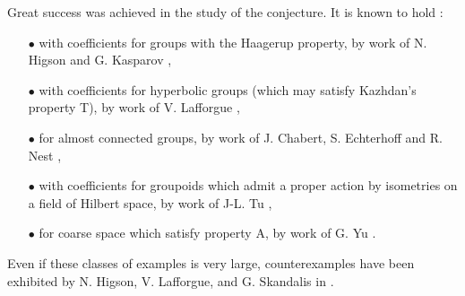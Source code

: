 Great success was achieved in the study of the conjecture. It is known to hold :\\
\begin{itemize}
\item[$\bullet$] with coefficients for groups with the Haagerup property, by work of N. Higson and G. Kasparov \cite{higsonkasparov},
\item[$\bullet$] with coefficients for hyperbolic groups (which may satisfy Kazhdan's property T), by work of V. Lafforgue \cite{Lafforgue}, 
\item[$\bullet$] for almost connected groups, by work of J. Chabert, S. Echterhoff and R. Nest \cite{chabertEN},
\item[$\bullet$] with coefficients for groupoids which admit a proper action by isometries on a field of Hilbert space, by work of J-L. Tu \cite{TuThese},
\item[$\bullet$] for coarse space which satisfy property A, by work of G. Yu \cite{Yu2}.\\
\end{itemize}  
Even if these classes of examples is very large, counterexamples have been exhibited by N. Higson, V. Lafforgue, and G. Skandalis in \cite{HigsonLaffSk}.\\

